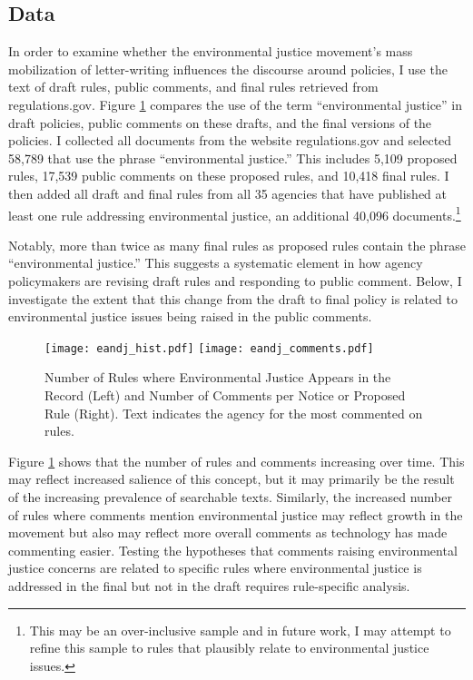 \subsection{Data}
In order to examine whether the environmental justice movement's mass mobilization of letter-writing influences the discourse around policies, I use the text of draft rules, public comments, and final rules retrieved from regulations.gov.  Figure \ref{fig:ej} compares the use of the term ``environmental justice'' in draft policies, public comments on these drafts, and the final versions of the policies. I collected all documents from the website regulations.gov and selected 58,789 that use the phrase ``environmental justice.'' This includes %
5,109 proposed rules, 17,539 public comments on these %
proposed rules, and 10,418 final rules. I then added all draft and final rules from all 35 agencies that have published at least one rule addressing environmental justice, an additional 40,096 documents.\footnote{This may be an over-inclusive sample and in future work, I may attempt to refine this sample to rules that plausibly relate to environmental justice issues.}  %

Notably, more than twice as many final rules as proposed rules contain the phrase ``environmental justice.'' This suggests a systematic element in how agency policymakers are revising draft rules and responding to public comment. Below, I investigate the extent that this change from the draft to final policy is related to environmental justice issues being raised in the public comments. 

\begin{figure}[h!]
\caption{Number of Rules where Environmental Justice Appears in the Record (Left) and Number of Comments per Notice or Proposed Rule (Right). Text indicates the agency for the most commented on rules.}
\texttt{[image: eandj\_hist.pdf]}
\texttt{[image: eandj\_comments.pdf]}
\label{fig:ej}
\end{figure}

Figure \ref{fig:ej} shows that the number of rules and comments increasing over time. This may reflect increased salience of this concept, but it may primarily be the result of the increasing prevalence of searchable texts.  Similarly, the increased number of rules where comments mention environmental justice may reflect growth in the movement but also may reflect more overall comments as technology has made commenting easier. Testing the hypotheses that comments raising environmental justice concerns are related to specific rules where environmental justice is addressed in the final but not in the draft requires rule-specific analysis. 

